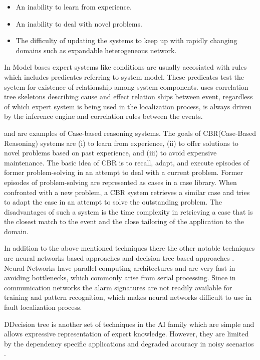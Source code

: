 \documentclass[10pt]{sigplan-proc-varsize}
\begin{document}
\begin{itemize}
  \item An inability to learn from experience.
  \item An inability to deal with novel problems.
  \item The difficulty of updating the systems to keep up with rapidly changing domains such as expandable heterogeneous network.
\end{itemize}

In Model bases expert systems like \cite{Nygate:95} conditions are usually accosiated with rules which includes predicates referring to system model. 
These predicates test the syetem for existence of relationship among system components. \cite{Nygate:95} 
uses correlation tree skeletons describing cause and effect relation ships between event,  regardless of which expert system is being used in the localization process, is always driven by the inference engine and correlation rules between the events. 

\cite{Lewis:93} and \cite{Gardner:96} are examples of Case-based reasoning systems. The goals of CBR(Case-Based Reasoning) systems are (i) to learn from experience, (ii) to 
offer solutions to novel problems based on past experience, and (iii) to avoid expensive maintenance. The basic idea of CBR is to recall, adapt, and 
execute episodes of former problem-solving in an attempt to deal with a current problem. Former episodes of problem-solving are represented as cases in a case 
library. When confronted with a new problem, a CBR system retrieves a similar case and tries to adapt the case in an attempt to solve the outstanding problem. 
The disadvantages of such a system is the time complexity in retrieving a case that is the closest match to the event and the close tailoring of the application 
to the domain.

In addition to the above mentioned techniques there the other notable techniques are neural networks based approaches \cite{Gardner:97} \cite{Gardner:98} and 
decision tree based approaches \cite{Rodosek:98}. Neural Networks have parallel computing architectures and are very fast in avoiding bottlenecks, which commonly arise from serial processing. Since in communication networks the alarm signatures are not readily available for training and pattern recognition, which makes neural networks difficult to use in fault localization process.

DDecision tree is another set of techniques in the AI family which are simple and allows expressive representation of expert knowledge. However, they are limited by the dependency specific applications and degraded accuracy in noisy scenarios \cite{Russell:96} \cite{Koller:10}.
\end{document}
